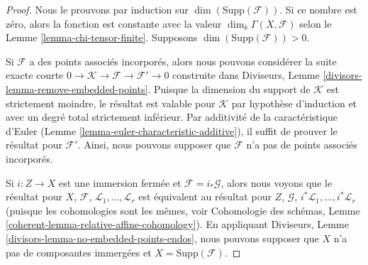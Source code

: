\begin{proof}
Nous le prouvons par induction sur
$\dim(\text{Supp}(\mathcal{F}))$. Si ce nombre est zéro, alors la fonction
est constante avec la valeur $\dim_k \Gamma(X, \mathcal{F})$ selon le Lemme
\ref{lemma-chi-tensor-finite}. Supposons $\dim(\text{Supp}(\mathcal{F})) > 0$.

\medskip\noindent
Si $\mathcal{F}$ a des points associés incorporés, alors
nous pouvons considérer la suite exacte courte $0 \to
\mathcal{K} \to \mathcal{F} \to \mathcal{F}' \to 0$
construite dans Diviseurs, Lemme
\ref{divisors-lemma-remove-embedded-points}. Puisque la dimension
du support de $\mathcal{K}$ est strictement moindre, le résultat
est valable pour $\mathcal{K}$ par hypothèse d'induction et avec un
degré total strictement inférieur. Par additivité de la
caractéristique d'Euler (Lemme
\ref{lemma-euler-characteristic-additive}), il suffit de prouver le résultat pour
$\mathcal{F}'$. Ainsi, nous pouvons supposer que $\mathcal{F}$ n'a pas de points associés incorporés.

\medskip\noindent
Si $i : Z \to X$ est une immersion fermée et $\mathcal{F} =
i_*\mathcal{G}$, alors nous voyons que le résultat pour $X$,
$\mathcal{F}$, $\mathcal{L}_1, \ldots, \mathcal{L}_r$ est
équivalent au résultat pour $Z$, $\mathcal{G}$, $i^*\mathcal{L}_1,
\ldots, i^*\mathcal{L}_r$ (puisque les cohomologies sont les
mêmes, voir Cohomologie des schémas, Lemme
\ref{coherent-lemma-relative-affine-cohomology}). En appliquant Diviseurs,
Lemme \ref{divisors-lemma-no-embedded-points-endos}, nous pouvons supposer
que $X$ n'a pas de composantes immergées et $X = \text{Supp}(\mathcal{F})$.


\end{proof}
